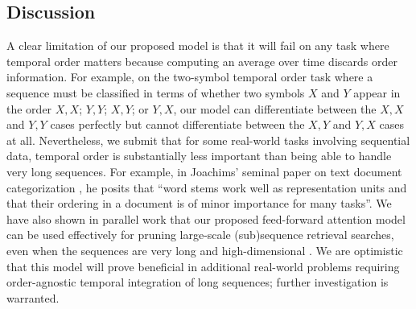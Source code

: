 \documentclass{article} %
\begin{document}
\subsection{Discussion}

A clear limitation of our proposed model is that it will fail on any task where temporal order matters because computing an average over time discards order information.
For example, on the two-symbol temporal order task \cite{hochreiter1997long} where a sequence must be classified in terms of whether two symbols $X$ and $Y$ appear in the order $X, X$; $Y, Y$; $X, Y$; or $Y, X$, our model can differentiate between the $X, X$ and $Y, Y$ cases perfectly but cannot differentiate between the $X, Y$ and $Y, X$ cases at all.
Nevertheless, we submit that for some real-world tasks involving sequential data, temporal order is substantially less important than being able to handle very long sequences.
For example, in Joachims' seminal paper on text document categorization \cite{joachims1998text}, he posits that ``word stems work well as representation units and that their ordering in a document is of minor importance for many tasks''.
We have also shown in parallel work that our proposed feed-forward attention model can be used effectively for pruning large-scale (sub)sequence retrieval searches, even when the sequences are very long and high-dimensional \cite{raffel2016pruning}.
We are optimistic that this model will prove beneficial in additional real-world problems requiring order-agnostic temporal integration of long sequences; further investigation is warranted.



\end{document}
